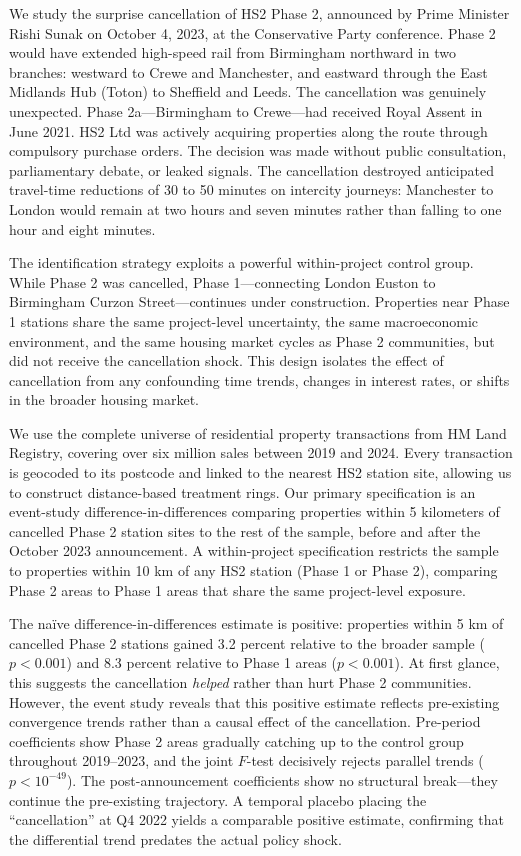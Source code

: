 \documentclass[12pt]{article}
\begin{document}
We study the surprise cancellation of HS2 Phase 2, announced by Prime Minister Rishi Sunak on October 4, 2023, at the Conservative Party conference. Phase 2 would have extended high-speed rail from Birmingham northward in two branches: westward to Crewe and Manchester, and eastward through the East Midlands Hub (Toton) to Sheffield and Leeds. The cancellation was genuinely unexpected. Phase 2a---Birmingham to Crewe---had received Royal Assent in June 2021. HS2 Ltd was actively acquiring properties along the route through compulsory purchase orders. The decision was made without public consultation, parliamentary debate, or leaked signals. The cancellation destroyed anticipated travel-time reductions of 30 to 50 minutes on intercity journeys: Manchester to London would remain at two hours and seven minutes rather than falling to one hour and eight minutes.

The identification strategy exploits a powerful within-project control group. While Phase 2 was cancelled, Phase 1---connecting London Euston to Birmingham Curzon Street---continues under construction. Properties near Phase 1 stations share the same project-level uncertainty, the same macroeconomic environment, and the same housing market cycles as Phase 2 communities, but did not receive the cancellation shock. This design isolates the effect of cancellation from any confounding time trends, changes in interest rates, or shifts in the broader housing market.

We use the complete universe of residential property transactions from HM Land Registry, covering over six million sales between 2019 and 2024. Every transaction is geocoded to its postcode and linked to the nearest HS2 station site, allowing us to construct distance-based treatment rings. Our primary specification is an event-study difference-in-differences comparing properties within 5 kilometers of cancelled Phase 2 station sites to the rest of the sample, before and after the October 2023 announcement. A within-project specification restricts the sample to properties within 10 km of any HS2 station (Phase 1 or Phase 2), comparing Phase 2 areas to Phase 1 areas that share the same project-level exposure.

The na\"ive difference-in-differences estimate is positive: properties within 5 km of cancelled Phase 2 stations gained 3.2 percent relative to the broader sample ($p < 0.001$) and 8.3 percent relative to Phase 1 areas ($p < 0.001$). At first glance, this suggests the cancellation \textit{helped} rather than hurt Phase 2 communities. However, the event study reveals that this positive estimate reflects pre-existing convergence trends rather than a causal effect of the cancellation. Pre-period coefficients show Phase 2 areas gradually catching up to the control group throughout 2019--2023, and the joint $F$-test decisively rejects parallel trends ($p < 10^{-49}$). The post-announcement coefficients show no structural break---they continue the pre-existing trajectory. A temporal placebo placing the ``cancellation'' at Q4 2022 yields a comparable positive estimate, confirming that the differential trend predates the actual policy shock.
\end{document}
